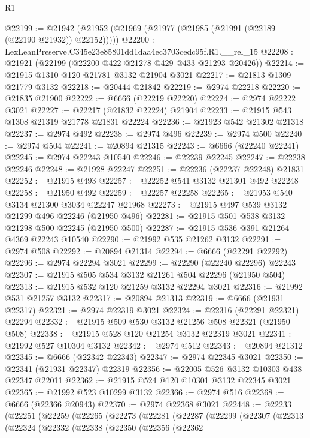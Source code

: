 \begin{lexlean}{R1}
\begin{coremodule}
@22199 := @21942 (@21952 (@21969 (@21977 (@21985 (@21991 (@22189 (@22190 @21932)) @22152)))))
@22200 := LexLeanPreserve.C345e23e85801dd1daa4ec3703cedc95f.R1.__rel_15
@22208 := @21921 (@22199 (@22200 @422 @21278 @429 @433 @21293 @20426))
@22214 := @21915 @1310 @120 @21781 @3132 @21904 @3021
@22217 := @21813 @1309 @21779 @3132
@22218 := @20444 @21842
@22219 := @2974 @22218
@22220 := @21835 @21900
@22222 := @6666 (@22219 @22220)
@22224 := @2974 @22222 @3021
@22227 := @22217 (@21832 @22224) @21904
@22233 := @21915 @543 @1308 @21319 @21778 @21831 @22224
@22236 := @21923 @542 @21302 @21318
@22237 := @2974 @492
@22238 := @2974 @496
@22239 := @2974 @500
@22240 := @2974 @504
@22241 := @20894 @21315
@22243 := @6666 (@22240 @22241)
@22245 := @2974 @22243 @10540
@22246 := @22239 @22245
@22247 := @22238 @22246
@22248 := @21928 @22247
@22251 := @22236 (@22237 @22248) @21831
@22252 := @21915 @493
@22257 := @22252 @541 @3132 @21301 @492 @22248
@22258 := @21950 @492
@22259 := @22257 @22258
@22265 := @21953 @540 @3134 @21300 @3034 @22247 @21968
@22273 := @21915 @497 @539 @3132 @21299 @496 @22246 (@21950 @496)
@22281 := @21915 @501 @538 @3132 @21298 @500 @22245 (@21950 @500)
@22287 := @21915 @536 @391 @21264 @4369 @22243 @10540
@22290 := @21992 @535 @21262 @3132
@22291 := @2974 @508
@22292 := @20894 @21314
@22294 := @6666 (@22291 @22292)
@22296 := @2974 @22294 @3021
@22299 := @22290 (@22240 @22296) @22243
@22307 := @21915 @505 @534 @3132 @21261 @504 @22296 (@21950 @504)
@22313 := @21915 @532 @120 @21259 @3132 @22294 @3021
@22316 := @21992 @531 @21257 @3132
@22317 := @20894 @21313
@22319 := @6666 (@21931 @22317)
@22321 := @2974 @22319 @3021
@22324 := @22316 (@22291 @22321) @22294
@22332 := @21915 @509 @530 @3132 @21256 @508 @22321 (@21950 @508)
@22338 := @21915 @528 @120 @21254 @3132 @22319 @3021
@22341 := @21992 @527 @10304 @3132
@22342 := @2974 @512
@22343 := @20894 @21312
@22345 := @6666 (@22342 @22343)
@22347 := @2974 @22345 @3021
@22350 := @22341 (@21931 @22347) @22319
@22356 := @22005 @526 @3132 @10303 @438 @22347 @22011
@22362 := @21915 @524 @120 @10301 @3132 @22345 @3021
@22365 := @21992 @523 @10299 @3132
@22366 := @2974 @516
@22368 := @6666 (@22366 @20943)
@22370 := @2974 @22368 @3021
@22448 := @22233
    (@22251
      (@22259
        (@22265
          (@22273
            (@22281
              (@22287
                (@22299
                  (@22307
                    (@22313
                      (@22324
                        (@22332
                          (@22338
                            (@22350
                              (@22356
                                (@22362

\end{coremodule}
\end{lexlean}
